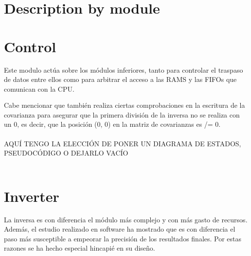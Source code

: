 \section{Description by module}
\section{Control}
Este modulo actúa sobre los módulos inferiores, tanto para controlar el traspaso de datos entre ellos como para arbitrar el acceso a las RAMS y las FIFOs que comunican con la CPU.

Cabe mencionar que también realiza ciertas comprobaciones en la escritura de la covarianza para asegurar que la primera división de la inversa no se realiza con un 0, es decir, que la posición (0, 0) en la matriz de covarianzas es /= 0.
\\
\\
AQUÍ TENGO LA ELECCIÓN DE PONER UN DIAGRAMA DE ESTADOS, PSEUDOCÓDIGO O DEJARLO VACÍO
\\
\\

\section{Inverter}
La inversa es con diferencia el módulo más complejo y con más gasto de recursos. Además, el estudio realizado en software ha mostrado que es con diferencia el paso más susceptible a empeorar la precisión de los resultados finales. Por estas razones se ha hecho especial hincapié en su diseño.
\\
